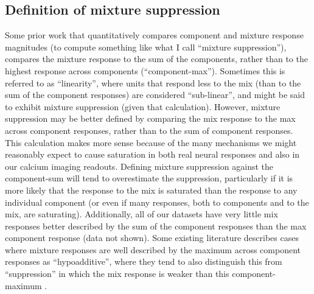 \documentclass[12pt]{caltech_thesis}
\renewcommand{\cite}{{ }\autocite}
\let\Oldsubsection\subsection
\renewcommand{\subsection}{\FloatBarrier\Oldsubsection}
\begin{document}
\begin{refsection}
\subsection{Definition of mixture suppression}
\label{ssec:mix_supp_def}
Some prior work that quantitatively compares component and mixture response magnitudes (to compute something like what I call ``mixture suppression''), compares the mixture response to the sum of the components, rather than to the highest response across components (``component-max'').
Sometimes this is referred to as ``linearity'', where units that respond less to the mix (than to the sum of the component responses) are considered ``sub-linear'', and might be said to exhibit mixture suppression (given that calculation).
However, mixture suppression may be better defined by comparing the mix response to the max across component responses, rather than to the sum of component responses.
This calculation makes more sense because of the many mechanisms we might reasonably expect to cause saturation in both real neural responses and also in our calcium imaging readouts.
Defining mixture suppression against the component-sum will tend to overestimate the suppression, particularly if it is more likely that the response to the mix is saturated than the response to any individual component (or even if many responses, both to components and to the mix, are saturating).
Additionally, all of our datasets have very little mix responses better described by the sum of the component responses than the max component response (data not shown).
Some existing literature describes cases where mixture responses are well described by the maximum across component responses as ``hypoadditive'', where they tend to also distinguish this from ``suppression'' in which the mix response is weaker than this component-maximum\cite{DuchampViret2003, LocustKCMixSpiking}.


\end{refsection}
\end{document}
